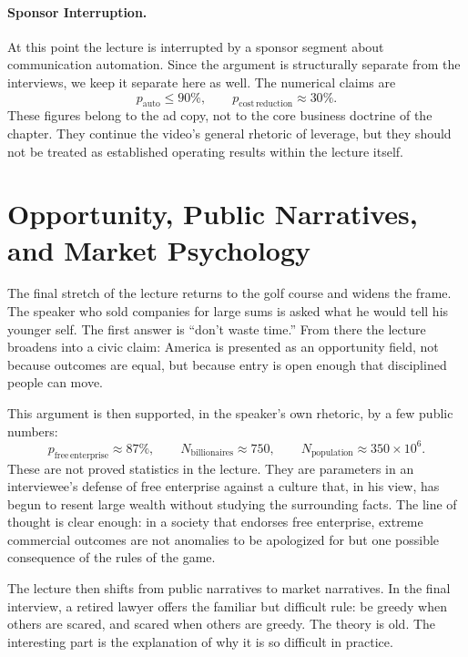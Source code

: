 \paragraph{Sponsor Interruption.} At this point the lecture is interrupted by a sponsor segment about communication automation. Since the argument is structurally separate from the interviews, we keep it separate here as well. The numerical claims are
\begin{equation}
p_{\mathrm{auto}} \le 90\%, \qquad
p_{\mathrm{cost\,reduction}} \approx 30\%.
\end{equation}
These figures belong to the ad copy, not to the core business doctrine of the chapter. They continue the video's general rhetoric of leverage, but they should not be treated as established operating results within the lecture itself.

\section{Opportunity, Public Narratives, and Market Psychology}

The final stretch of the lecture returns to the golf course and widens the frame. The speaker who sold companies for large sums is asked what he would tell his younger self. The first answer is ``don't waste time.'' From there the lecture broadens into a civic claim: America is presented as an opportunity field, not because outcomes are equal, but because entry is open enough that disciplined people can move.

This argument is then supported, in the speaker's own rhetoric, by a few public numbers:
\begin{equation}
p_{\mathrm{free\,enterprise}} \approx 87\%, \qquad
N_{\mathrm{billionaires}} \approx 750, \qquad
N_{\mathrm{population}} \approx 350\times 10^6.
\end{equation}
These are not proved statistics in the lecture. They are parameters in an interviewee's defense of free enterprise against a culture that, in his view, has begun to resent large wealth without studying the surrounding facts. The line of thought is clear enough: in a society that endorses free enterprise, extreme commercial outcomes are not anomalies to be apologized for but one possible consequence of the rules of the game.

The lecture then shifts from public narratives to market narratives. In the final interview, a retired lawyer offers the familiar but difficult rule: be greedy when others are scared, and scared when others are greedy. The theory is old. The interesting part is the explanation of why it is so difficult in practice.

